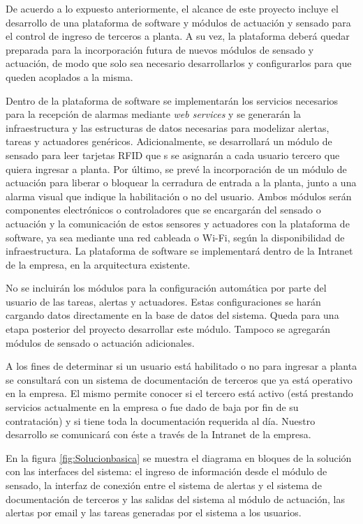De acuerdo a lo expuesto anteriormente, el alcance de este proyecto incluye el desarrollo de una plataforma de software y módulos de actuación y sensado para el control de ingreso de terceros a planta. A su vez, la plataforma deberá quedar preparada para la incorporación futura de nuevos módulos de sensado y actuación, de modo que solo sea necesario desarrollarlos y configurarlos para que queden acoplados a la misma.

Dentro de la plataforma de software se implementarán los servicios necesarios para la recepción de alarmas mediante \textit{web services} y se generarán la infraestructura y las estructuras de datos necesarias para modelizar alertas, tareas y actuadores genéricos. Adicionalmente, se desarrollará un módulo de sensado para leer tarjetas RFID que s se asignarán a cada usuario tercero que quiera ingresar a planta. Por último, se prevé la incorporación de un módulo de actuación para liberar o bloquear la cerradura de entrada a la planta, junto a una alarma visual que indique la habilitación o no del usuario. Ambos módulos serán componentes electrónicos o controladores que se encargarán del sensado o actuación y la comunicación de estos sensores y actuadores con la plataforma de software, ya sea mediante una red cableada o Wi-Fi, según la disponibilidad de infraestructura. La plataforma de software se implementará dentro de la Intranet de la empresa, en la arquitectura existente.

No se incluirán los módulos para la configuración automática por parte del usuario de las tareas, alertas y actuadores. Estas configuraciones se harán cargando datos directamente en la base de datos del sistema. Queda para una etapa posterior del proyecto desarrollar este módulo. Tampoco se agregarán módulos de sensado o actuación adicionales.

A los fines de determinar si un usuario está habilitado o no para ingresar a planta se consultará con un sistema de documentación de terceros que ya está operativo en la empresa. El mismo permite conocer si el tercero está activo (está prestando servicios actualmente en la empresa o fue dado de baja por fin de su contratación) y si tiene toda la documentación requerida al día. Nuestro desarrollo se comunicará con éste a través de la Intranet de la empresa.

En la figura \ref{fig:Solucionbasica} se muestra el diagrama en bloques de la solución con las interfaces del sistema: el ingreso de información desde el módulo de sensado, la interfaz de conexión entre el sistema de alertas y el sistema de documentación de terceros y las salidas del sistema al módulo de actuación, las alertas por email y las tareas generadas por el sistema a los usuarios.

